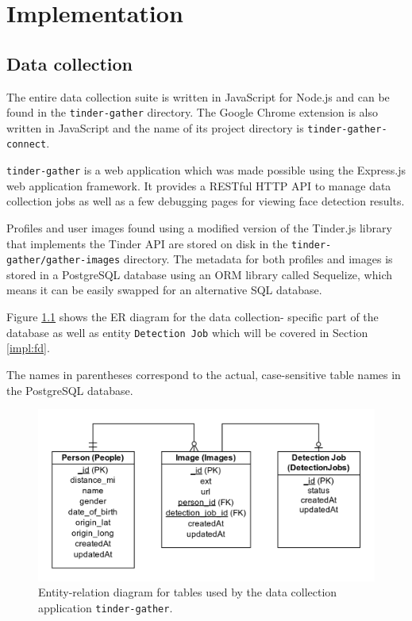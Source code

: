 \chapter{Implementation}
\label{impl}
\section{Data collection}
The entire data collection suite is written in JavaScript for Node.js and can 
be found in the \texttt{tinder-gather} directory. The Google Chrome extension 
is also written in JavaScript and the name of its project directory is 
\texttt{tinder-gather-connect}.

\texttt{tinder-gather} is a web application which was made possible using the 
Express.js web application framework. It provides a RESTful HTTP API to manage 
data collection jobs as well as a few debugging pages for viewing face 
detection results.

Profiles and user images found using a modified version of the Tinder.js 
library that implements the Tinder API are stored on disk in the 
\texttt{tinder-gather/gather-images} directory. The metadata for both profiles 
and images is stored in a PostgreSQL database using an ORM library called 
Sequelize, which means it can be easily swapped for an alternative SQL 
database.

Figure \ref{fig:impl:erd_basic} shows the ER diagram for the data collection-
specific part of the database as well as entity \texttt{Detection Job} which 
will be covered in Section \ref{impl:fd}.

The names in parentheses correspond to the actual, case-sensitive table names 
in the PostgreSQL database. 
\begin{figure}[t]
  \centering
  \includegraphics[width=\textwidth]{figures/impl/erd_basic}
  \caption{Entity-relation diagram for tables used by the data collection 
  application \texttt{tinder-gather}. }
  \label{fig:impl:erd_basic}
\end{figure}

